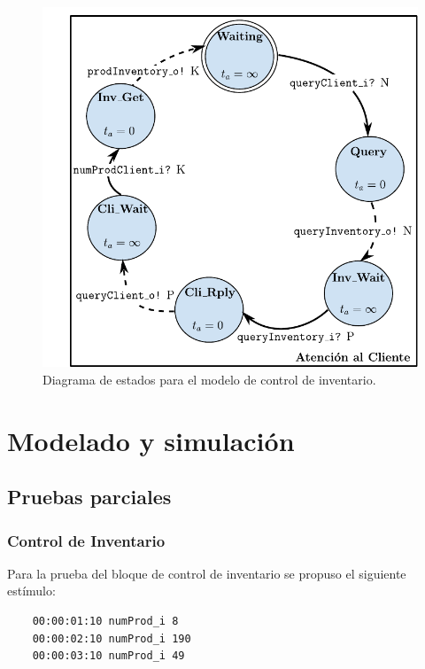 \documentclass[10pt]{article}
\begin{document}
\begin{figure}[htbp]
	\centering
	\includegraphics{img/atencionClientedevsgraph}
	\caption{Diagrama de estados para el modelo de control de inventario.}
	\label{fig:AC-estados}
\end{figure}


\section{Modelado y simulación}

\subsection{Pruebas parciales}
\subsubsection{Control de Inventario}
Para la prueba del bloque de control de inventario se propuso el siguiente estímulo:

\begin{minipage}{1\textwidth}
	\centering
	\begin{lstlisting}
	00:00:01:10 numProd_i 8
	00:00:02:10 numProd_i 190
	00:00:03:10 numProd_i 49
	\end{lstlisting}
	
	\centering
\end{minipage}
\end{document}
